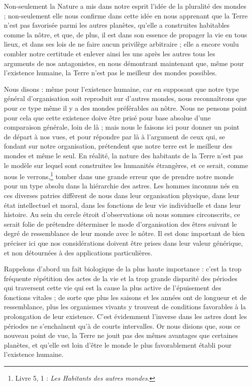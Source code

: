 \documentclass[a4paper, 11pt, oneside]{article}
\begin{document}
Non-seulement la Nature a mis dans notre esprit l'idée de la pluralité des mondes ; non-seulement elle nous confirme dans cette idée en nous apprenant que la Terre n'est pas favorisée parmi les autres planètes, qu'elle a construites habitables comme la nôtre, et que, de plus, il est dans son essence de propager la vie en tous lieux, et dans ses lois de ne faire aucun privilège arbitraire ; elle a encore voulu combler notre certitude et enlever ainsi les uns après les autres tous les arguments de nos antagonistes, en nous démontrant maintenant que, même pour l'existence humaine, la Terre n'est pas le meilleur des mondes possibles.

Nous disons : même pour l'existence humaine, car en supposant que notre type général d'organisation soit reproduit sur d'autres mondes, nous reconnaîtrons que pour ce type même il y a des mondes préférables au nôtre. Nous ne pensons point pour cela que cette existence doive être prisé pour base absolue d'une comparaison générale, loin de là ; mais nous le faisons ici pour donner un point de départ à nos vues, et pour répondre par là à l'argument de ceux qui, se fondant sur notre organisation, prétendent que notre terre est le meilleur des mondes et même le seul. En réalité, la nature des habitants de la Terre n'est pas le modèle sur lequel sont construites les humanités étrangères, et ce serait, comme nous le verrons,\footnote{Livre 5, 1 : \emph{Les Habitants des autres mondes}.} tomber dans une grande erreur que de prendre notre monde pour un type absolu dans la hiérarchie des astres. Les hommes inconnus nés en ces diverses patries diffèrent de nous dans leur organisation physique, dans leur état intellectuel et moral, dans les fonctions de leur vie individuelle et dans leur histoire. Au sein du cercle étroit d'observations où nous sommes circonscrits, ce serait folie de prétendre déterminer le mode d'organisation des êtres suivant le degré de ressemblance de leur monde avec le nôtre. Il est donc important de bien préciser ici que nos considérations doivent être prises dans leur valeur générique, et non détournées à des applications particulières.

Rappelons d'abord un fait biologique de la plus haute importance : c'est la trop fréquente répétition des actes de la vie et la trop grande disparité des périodes qui traversent cette vie qui est la cause la plus active de l'épuisement des fonctions vitales ; de sorte que plus les saisons et les années ont de longueur et de ressemblance, plus les organismes vivants y trouvent de conditions favorables à la prolongation de leur existence. C'est évidemment l'inverse dans les astres dont les périodes ne s'enchaînent qu'à de courts intervalles. Or nous disions que, sous ce nouveau point de vue, la Terre ne jouit pas des mêmes avantages que certaines planètes, et qu'elle est loin d'être le monde le plus favorablement établi pour l'existence humaine.
\end{document}
